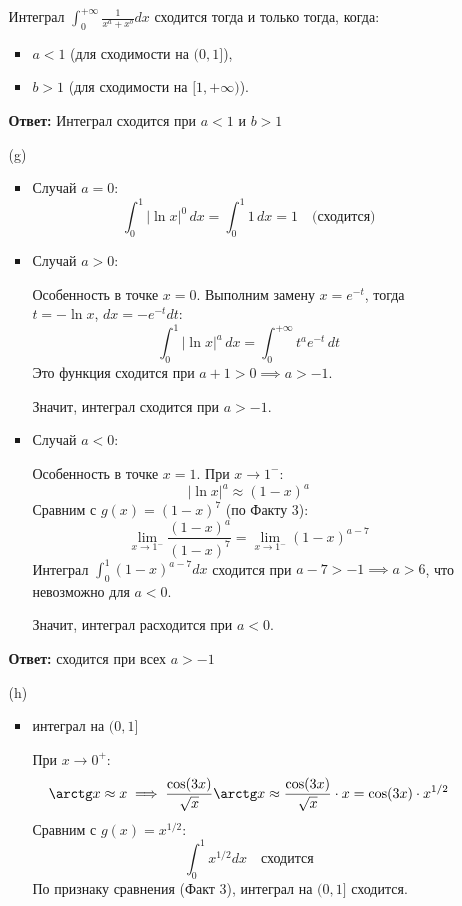 \documentclass[a4paper]{article}
\begin{document}
\begin{enumerate}
\begin{enumerate}
    Интеграл \(\int_{0}^{+\infty} \frac{1}{x^a + x^b} dx\) сходится
    тогда и только тогда, когда:
    \begin{itemize}
    \item 
    \(a < 1\) (для сходимости на \((0, 1]\)),
    \item
    \(b > 1\) (для сходимости на \([1, +\infty)\)).
    \end{itemize}

    \textbf{Ответ: } Интеграл сходится при  \(a < 1\)  и  \(b>1\) \\

    \item[(g)]\begin{itemize}
      \item Случай \(a = 0\):
      \[
      \int_{0}^{1} |\ln x|^0 \, dx = \int_{0}^{1} 1 \, dx = 1 \quad \text{(сходится)}
      \]
      \item Случай \(a > 0\):
      
       Особенность в точке \(x = 0\). Выполним замену \(x = e^{-t}\),
        тогда \(t = -\ln x\), \(dx = -e^{-t} dt\):  
      \[
      \int_{0}^{1} |\ln x|^a \, dx = \int_{0}^{+\infty} t^a e^{-t} \, dt
      \]  
      Это функция  сходится при
       \(a + 1 > 0 \implies a > -1\).  
      
       Значит, интеграл сходится при \(a > -1\).

      \item Случай \(a < 0\):
      
      Особенность в точке \(x = 1\). При \(x \to 1^-\):  
      \[
      |\ln x|^a \approx (1 - x)^a
      \]  
      Сравним с \(g(x) = (1 - x)^7\) (по Факту 3):  
      \[
      \lim_{x \to 1^-} \frac{(1 - x)^a}{(1 - x)^7} = \lim_{x \to 1^-} (1 - x)^{a - 7}
      \]  
      Интеграл \(\int_{0}^{1} (1 - x)^{a - 7} dx\) сходится при 
      \(a - 7 > -1 \implies a > 6\), что невозможно для \(a < 0\).  
      
      Значит, интеграл расходится при \(a < 0\). 
    \end{itemize}
    \textbf{Ответ: } сходится при всех $a > -1$\\ 

    \item[(h)]
    \begin{itemize}
      \item интеграл на $(0, 1]$
      
      При \(x \to 0^+\):  
     \[
     \arctg x \approx x \implies \frac{\cos(3x)}{\sqrt{x}} \arctg x
      \approx \frac{\cos(3x)}{\sqrt{x}} \cdot x = \cos(3x) \cdot x^{1/2}
     \]  
     Сравним с \(g(x) = x^{1/2}\):  
     \[
     \int_{0}^{1} x^{1/2} dx \quad \text{сходится}
     \]  
     По признаку сравнения (Факт 3), интеграл на \((0, 1]\) сходится.


\end{itemize}
\end{enumerate}
\end{enumerate}
\end{document}
